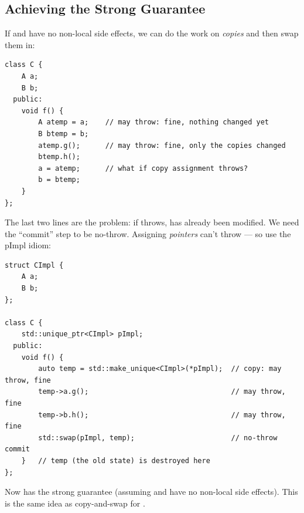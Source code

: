 \subsection{Achieving the Strong Guarantee}
If  and  have no non-local side effects, we can do the
work on \emph{copies} and then swap them in:
\begin{lstlisting}[style=cpp]
class C {
    A a;
    B b;
  public:
    void f() {
        A atemp = a;    // may throw: fine, nothing changed yet
        B btemp = b;
        atemp.g();      // may throw: fine, only the copies changed
        btemp.h();
        a = atemp;      // what if copy assignment throws?
        b = btemp;
    }
};
\end{lstlisting}
The last two lines are the problem: if  throws,  has
already been modified. We need the ``commit'' step to be no-throw. Assigning
\emph{pointers} can't throw --- so use the pImpl idiom:
\begin{lstlisting}[style=cpp]
struct CImpl {
    A a;
    B b;
};

class C {
    std::unique_ptr<CImpl> pImpl;
  public:
    void f() {
        auto temp = std::make_unique<CImpl>(*pImpl);  // copy: may throw, fine
        temp->a.g();                                  // may throw, fine
        temp->b.h();                                  // may throw, fine
        std::swap(pImpl, temp);                       // no-throw commit
    }   // temp (the old state) is destroyed here
};
\end{lstlisting}
Now  has the strong guarantee (assuming  and  have no
non-local side effects). This is the same idea as copy-and-swap for
.
\begin{center}
\end{center}

